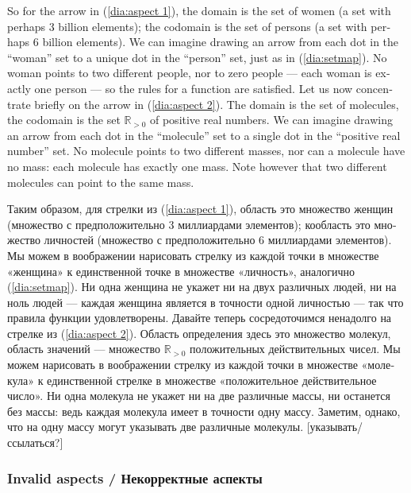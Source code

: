\documentclass{book}
\def\RR{{\mathbb R}}
\theoremstyle{theoremENG}
\theoremstyle{lemmaENG}
\theoremstyle{propositionENG}
\theoremstyle{corollaryENG}
\theoremstyle{factENG}
\theoremstyle{remarkENG}
\theoremstyle{exampleENG}
\theoremstyle{warningENG}
\theoremstyle{questionENG}
\theoremstyle{guessENG}
\theoremstyle{answerENG}
\theoremstyle{constructionENG}
\theoremstyle{rulesENG}
\theoremstyle{excENG}
\theoremstyle{appENG}
\theoremstyle{definitionENG}
\theoremstyle{notationENG}
\theoremstyle{conjectureENG}
\theoremstyle{postulateENG}
\theoremstyle{theoremRUS}
\theoremstyle{lemmaRUS}
\theoremstyle{propositionRUS}
\theoremstyle{corollaryRUS}
\theoremstyle{factRUS}
\theoremstyle{remarkRUS}
\theoremstyle{exampleRUS}
\theoremstyle{warningRUS}
\theoremstyle{questionRUS}
\theoremstyle{guessRUS}
\theoremstyle{answerRUS}
\theoremstyle{constructionRUS}
\theoremstyle{rulesRUS}
\theoremstyle{excRUS}
\theoremstyle{appRUS}
\theoremstyle{definitionRUS}
\theoremstyle{notationRUS}
\theoremstyle{conjectureRUS}
\theoremstyle{postulateRUS}
\begin{document}
\begin{english}
So for the arrow in (\ref{dia:aspect 1}), the domain is the set of women (a set with perhaps 3 billion elements); the codomain is the set of persons (a set with perhaps 6 billion elements).   We can imagine drawing an arrow from each dot in the “woman” set to a unique dot in the “person” set, just as in (\ref{dia:setmap}).  No woman points to two different people, nor to zero people — each woman is exactly one person — so the rules for a function are satisfied.  Let us now concentrate briefly on the arrow in (\ref{dia:aspect 2}).  The domain is the set of molecules, the codomain is the set $\RR_{>0}$ of positive real numbers.  We can imagine drawing an arrow from each dot in the “molecule” set to a single dot in the “positive real number” set.  No molecule points to two different masses, nor can a molecule have no mass: each molecule has exactly one mass.  Note however that two different molecules can point to the same mass.

\begin{russian}Таким образом, для стрелки из (\ref{dia:aspect 1}), область это множество женщин (множество с предположительно 3 миллиардами элементов); кообласть это множество личностей (множество с предположительно 6 миллиардами элементов).  Мы можем в воображении нарисовать стрелку из каждой точки в множестве «женщина» к единственной точке в множестве «личность», аналогично (\ref{dia:setmap}).  Ни одна женщина не укажет ни на двух различных людей, ни на ноль людей — каждая женщина является в точности одной личностью — так что правила функции удовлетворены.  Давайте теперь сосредоточимся ненадолго на стрелке из (\ref{dia:aspect 2}).  Область определения здесь это множество молекул, область значений — множество $\RR_{>0}$ положительных действительных чисел.  Мы можем нарисовать в воображении стрелку из каждой точки в множестве «молекула» к единственной стрелке в множестве «положительное действительное число».  Ни одна молекула не укажет ни на две различные массы, ни останется без массы: ведь каждая молекула имеет в точности одну массу.  Заметим, однако, что на одну массу могут указывать две различные молекулы. [указывать/ссылаться?] \end{russian}


\subsubsection{Invalid aspects / Некорректные аспекты}\label{sec:invalid aspect}


\end{english}
\end{document}
